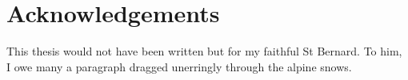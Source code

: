 \chapter*{Acknowledgements}
%
%
This thesis would not have been written but for my faithful St Bernard. To him, I owe many a paragraph dragged unerringly through the alpine snows.